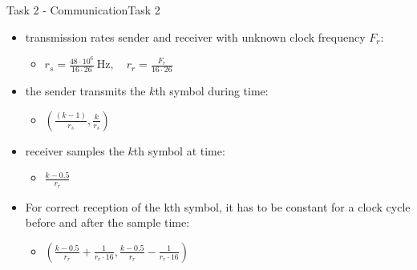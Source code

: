 {\begin{frame}{Task 2 - Communication}{Task 2}
  \begin{solutionnoinc}
    \begin{itemize}
      \item \alert{transmission rates sender and receiver with unknown clock frequency $F_r$:}
      \begin{itemize}
        \item $r_s=\frac{48 \cdot 10^6}{16 \cdot 26} \mathrm{~Hz}, \quad r_r=\frac{F_r}{16 \cdot 26}$
      \end{itemize}
      \item \alert{the sender transmits the $k$th symbol during time:}
      \begin{itemize}
        \item $\left(\frac{(k-1)}{r_s}, \frac{k}{r_s}\right)$
      \end{itemize}
      \item \alert{receiver samples the $k$th symbol at time:}
      \begin{itemize}
        \item $\frac{k-0.5}{r_r}$
      \end{itemize}
      \item \alert{For correct reception of the kth symbol, it has to be constant for a clock cycle before and after the sample time:}
      \begin{itemize}
        \item $\left(\frac{k-0.5}{r_r}+\frac{1}{r_r \cdot 16}, \frac{k-0.5}{r_r}-\frac{1}{r_r \cdot 16}\right)$
      \end{itemize}
    \end{itemize}
  \end{solutionnoinc}


\end{frame}}
